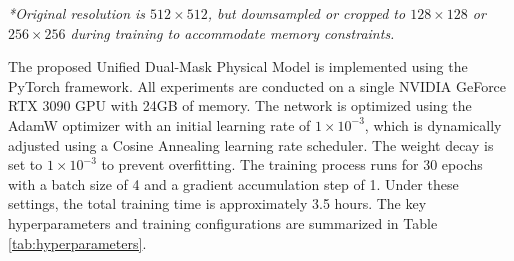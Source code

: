 \documentclass[lettersize,journal]{IEEEtran}
\begin{document}
\begin{table}[t]
\centering
\caption{Summary of the Light Field Datasets Used for Training and Validation}
\label{tab:datasets_summary}
\footnotesize{\textit{*Original resolution is $512 \times 512$, but downsampled or cropped to $128 \times 128$ or $256 \times 256$ during training to accommodate memory constraints.}}
\end{table}

The proposed Unified Dual-Mask Physical Model is implemented using the PyTorch framework. All experiments are conducted on a single NVIDIA GeForce RTX 3090 GPU with 24GB of memory. The network is optimized using the AdamW optimizer with an initial learning rate of $1 \times 10^{-3}$, which is dynamically adjusted using a Cosine Annealing learning rate scheduler. The weight decay is set to $1 \times 10^{-3}$ to prevent overfitting. The training process runs for 30 epochs with a batch size of 4 and a gradient accumulation step of 1. Under these settings, the total training time is approximately 3.5 hours. The key hyperparameters and training configurations are summarized in Table \ref{tab:hyperparameters}.
\end{document}
